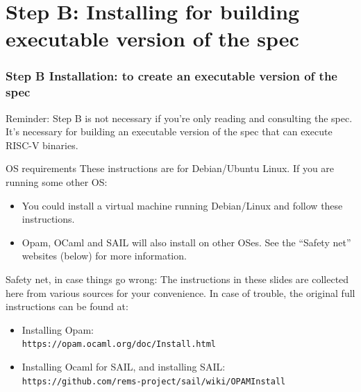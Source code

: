 \documentclass[aspectratio=169]{beamer}
\newcommand{\hm}{\hspace*{1em}}
\newcommand{\scripttt}{\scriptsize\tt}
\begin{document}

\section{Step B: Installing for building executable version of the spec}

\begin{frame}
  \frametitle{Step B Installation: to create an executable version of the spec}

  {\scriptsize Reminder: Step B is not necessary if you're only
    reading and consulting the spec.  It's necessary for building an
    executable version of the spec that can execute RISC-V binaries.}

  \begin{block}{OS requirements}
    \scriptsize
    These instructions are for Debian/Ubuntu Linux.  If you are running some other OS:
    \begin{itemize}
      \item You could install a virtual machine running Debian/Linux and follow these instructions.


      \item Opam, OCaml and SAIL will also install on other OSes.  See the ``Safety
        net'' websites (below) for more information.

    \end{itemize}
  \end{block}

  \begin{block}{Safety net, in case things go wrong:}
    \scriptsize
    The instructions in these slides are collected here from various
    sources for your convenience. In case of trouble, the original
    full instructions can be found at:

    \begin{itemize}

      \item Installing Opam: \\
        {\scripttt\hm https://opam.ocaml.org/doc/Install.html}

      \item Installing Ocaml for SAIL, and installing SAIL: \\
        {\scripttt\hm https://github.com/rems-project/sail/wiki/OPAMInstall}

    \end{itemize}
  \end{block}

\end{frame}
\end{document}
